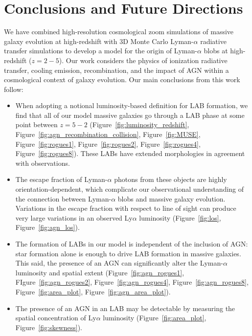 \chapter{Conclusions and Future Directions}
\label{sec:discussion}
\label{sec:conclusions}

We have combined high-resolution cosmological zoom simulations of massive galaxy evolution at high-redshift with $3$D Monte Carlo Lyman-$\alpha$ radiative transfer simulations to develop a model for the origin of Lyman-$\alpha$ blobs at high-redshift ($z=2-5$).
Our work considers the physics of ionization radiative transfer, cooling emission, recombination, and the impact of AGN within a cosmological context of galaxy evolution.
Our main conclusions from this work follow:
\begin{itemize}

    \item When adopting a notional luminosity-based definition for LAB formation, we find that all of our model massive galaxies go through a LAB phase at some point between $z=5-2$ (Figure~\ref{fig:luminosity_redshift}, Figure~\ref{fig:agn_recombination_collision}, Figure~\ref{fig:MUSE}, Figure~\ref{fig:rogues1}, Figure~\ref{fig:rogues2}, Figure~\ref{fig:rogues4}, Figure~\ref{fig:rogues8}).  These LABs have extended morphologies in agreement with observations.

    \item The escape fraction of Lyman-$\alpha$ photons from these objects are highly orientation-dependent, which complicate our observational understanding of the connection between Lyman-$\alpha$ blobs and massive galaxy evolution. Variations in the escape fraction with respect to line of sight can produce very large variations in an observed Ly$\alpha$ luminosity (Figure~\ref{fig:los}, Figure~\ref{fig:agn_los}).
    
    \item The formation of LABs in our model is independent of the inclusion of AGN: star formation alone is enough to drive LAB formation in massive galaxies. This said, the presence of an AGN can significantly alter the Lyman-$\alpha$ luminosity and spatial extent (Figure~\ref{fig:agn_rogues1}, FIgure~\ref{fig:agn_rogues2}, Figure~\ref{fig:agn_rogues4}, Figure~\ref{fig:agn_rogues8}, Figure~\ref{fig:area_plot}, Figure~\ref{fig:agn_area_plot}).
    
    \item The presence of an AGN in an LAB may be detectable by measuring the spatial concentration of Ly$\alpha$ luminosity (Figure~\ref{fig:area_plot}, Figure~\ref{fig:skewness}).
    

\end{itemize}
